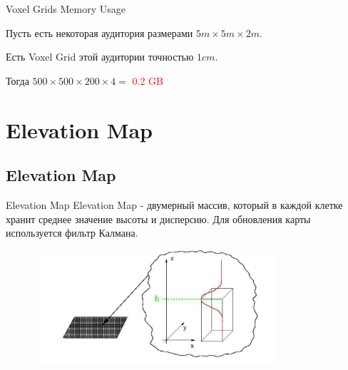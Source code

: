 \documentclass[9pt]{beamer}
\begin{document}
\begin{frame}{Voxel Grids Memory Usage}

Пусть есть некоторая аудитория размерами $5m \times 5m \times 2m$.

Есть Voxel Grid этой аудитории точностью $1cm$.

Тогда $500 \times 500 \times 200 \times 4 =$  \textcolor{red}{0.2 GB}

\end{frame}



\section{Elevation Map}

\subsection{Elevation Map}


\begin{frame}{Elevation Map}
  Elevation Map - двумерный массив, который в каждой клетке хранит среднее значение высоты и дисперсию.
  Для обновления карты используется фильтр Калмана.

  \begin{figure}[h]
    \centering
    \includegraphics[width=0.8\textwidth]{elev_m_grid.png}
  \end{figure}
\end{frame}
\end{document}
